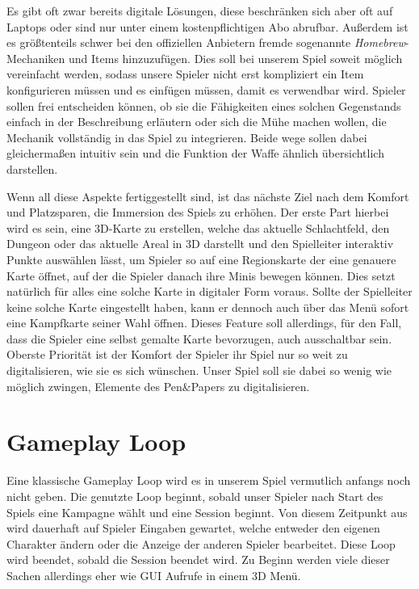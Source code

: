 \documentclass[11pt]{article}
\begin{document}
    Es gibt oft zwar bereits digitale Lösungen, diese beschränken sich aber oft auf Laptops
    oder sind nur unter einem kostenpflichtigen Abo abrufbar.
    Außerdem ist es größtenteils schwer bei den offiziellen Anbietern fremde sogenannte \textit{Homebrew}-Mechaniken
    und Items hinzuzufügen.
    Dies soll bei unserem Spiel soweit möglich vereinfacht werden, sodass unsere Spieler nicht erst kompliziert
    ein Item konfigurieren müssen und es einfügen müssen, damit es verwendbar wird.
    Spieler sollen frei entscheiden können, ob sie die Fähigkeiten eines solchen Gegenstands einfach
    in der Beschreibung erläutern oder sich die Mühe machen wollen, die Mechanik vollständig in das
    Spiel zu integrieren.
    Beide wege sollen dabei gleichermaßen intuitiv sein und die Funktion der Waffe ähnlich
    übersichtlich darstellen.\newblock

    Wenn all diese Aspekte fertiggestellt sind, ist das nächste Ziel nach dem Komfort und Platzsparen, die Immersion des
    Spiels zu erhöhen.\n
    Der erste Part hierbei wird es sein, eine 3D-Karte zu erstellen, welche das aktuelle Schlachtfeld, den Dungeon oder
    das aktuelle Areal in 3D darstellt und den Spielleiter interaktiv Punkte auswählen lässt, um Spieler so auf eine
    Regionskarte der eine genauere Karte öffnet, auf der die Spieler danach ihre Minis bewegen können.
    Dies setzt natürlich für alles eine solche Karte in digitaler Form voraus.
    Sollte der Spielleiter keine solche Karte eingestellt haben, kann er dennoch auch über das Menü sofort
    eine Kampfkarte seiner Wahl öffnen.
    Dieses Feature soll allerdings, für den Fall, dass die Spieler eine selbst gemalte Karte bevorzugen, auch
    ausschaltbar sein.
    Oberste Priorität ist der Komfort der Spieler ihr Spiel nur so weit zu digitalisieren, wie sie es sich wünschen.
    Unser Spiel soll sie dabei so wenig wie möglich zwingen, Elemente des Pen\&Papers zu digitalisieren.\n

    \section{Gameplay Loop}\label{sec:chapter_gameloop}

    Eine klassische Gameplay Loop wird es in unserem Spiel vermutlich anfangs noch nicht geben.
    Die genutzte Loop beginnt, sobald unser Spieler nach Start des Spiels eine Kampagne wählt und eine Session beginnt.
    Von diesem Zeitpunkt aus wird dauerhaft auf Spieler Eingaben gewartet, welche entweder den eigenen Charakter ändern
    oder die Anzeige der anderen Spieler bearbeitet.
    Diese Loop wird beendet, sobald die Session beendet wird.
    Zu Beginn werden viele dieser Sachen allerdings eher wie GUI Aufrufe in einem 3D Menü. \newblock
\end{document}
